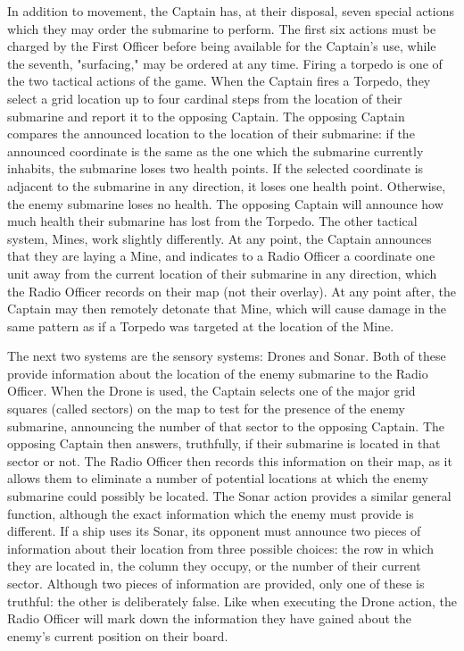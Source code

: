 
In addition to movement, the Captain has, at their disposal, seven special actions which they may order the submarine to perform. The first six actions must be charged by the First Officer before being available for the Captain's use, while the seventh, "surfacing," may be ordered at any time. Firing a torpedo is one of the two tactical actions of the game. When the Captain fires a Torpedo, they select a grid location up to four cardinal steps from the location of their submarine and report it to the opposing Captain. The opposing Captain compares the announced location to the location of their submarine: if the announced coordinate is the same as the one which the submarine currently inhabits, the submarine loses two health points. If the selected coordinate is adjacent to the submarine in any direction, it loses one health point. Otherwise, the enemy submarine loses no health. The opposing Captain will announce how much health their submarine has lost from the Torpedo. The other tactical system, Mines, work slightly differently. At any point, the Captain announces that they are laying a Mine, and indicates to a Radio Officer a coordinate one unit away from the current location of their submarine in any direction, which the Radio Officer records on their map (not their overlay). At any point after, the Captain may then remotely detonate that Mine, which will cause damage in the same pattern as if a Torpedo was targeted at the location of the Mine. 


The next two systems are the sensory systems: Drones and Sonar. Both of these provide information about the location of the enemy submarine to the Radio Officer. When the Drone is used, the Captain selects one of the major grid squares (called sectors) on the map to test for the presence of the enemy submarine, announcing the number of that sector to the opposing Captain. The opposing Captain then answers, truthfully, if their submarine is located in that sector or not. The Radio Officer then records this information on their map, as it allows them to eliminate a number of potential locations at which the enemy submarine could possibly be located. The Sonar action provides a similar general function, although the exact information which the enemy must provide is different. If a ship uses its Sonar, its opponent must announce two pieces of information about their location from three possible choices: the row in which they are located in, the column they occupy, or the number of their current sector. Although two pieces of information are provided, only one of these is truthful: the other is deliberately false. Like when executing the Drone action, the Radio Officer will mark down the information they have gained about the enemy's current position on their board.

